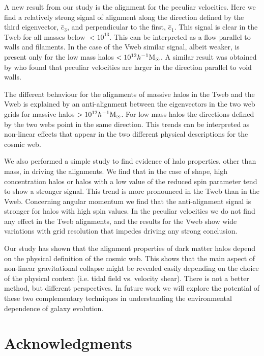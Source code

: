 \documentclass[useAMS,usenatbib]{mn2e}
\newcommand{\hMsun}{{\ifmmode{h^{-1}{\rm
        {M_{\odot}}}}\else{$h^{-1}{\rm{M_{\odot}}}$~}\fi}}
\begin{document}
A new result from our study is the alignment for the peculiar
velocities. Here we find a relatively strong signal of alignment along
the direction defined by the third eigenvector, $\hat{e}_3$, and perpendicular to
the first, $\hat{e}_1$. This signal is clear in the Tweb for all masses below
$<10^{13}$\hMsun. This can be interpreted as a flow parallel to walls
and filaments. In the case of the Vweb similar signal, albeit weaker,
is present only for the low mass halos $<10^{12}\hMsun$.
A similar result was obtained by \citep{Padilla2005} who found that
peculiar velocities are larger in the direction parallel to void walls.

The different behaviour for the alignments of massive halos in the
Tweb and the Vweb is explained by an anti-alignment between the
eigenvectors in the two web grids for massive halos
$>10^{12}\hMsun$. For low mass halos the directions defined by the two
webs point in the same direction. This trends can be interpreted as
non-linear effects that appear in the two different physical
descriptions for the cosmic web.

We also performed a simple study to find evidence of halo properties,
other than mass, in driving the alignments. We find that in the case of
shape, high concentration halos or halos with a low value of
the reduced spin parameter tend to show a stronger signal. This trend is
more pronounced in the Tweb than in the Vweb. Concerning angular
momentum we find that the anti-alignment signal is stronger for halos
with high spin values. In the peculiar velocities we do not find any
effect in the Tweb alignments, and the results for the Vweb show 
wide variations with grid resolution that impedes driving any strong
conclusion.

Our study has shown that the alignment properties of dark matter
halos depend on the physical definition of the cosmic web. This shows
that the main aspect of non-linear gravitational collapse might be
revealed easily depending on the choice of the physical context
(i.e. tidal field vs. velocity shear). There is not a better method,
but different perspectives. In future work we will explore the
potential of these two complementary techniques in understanding the
environmental dependence of galaxy evolution.

\section*{Acknowledgments}
\end{document}
